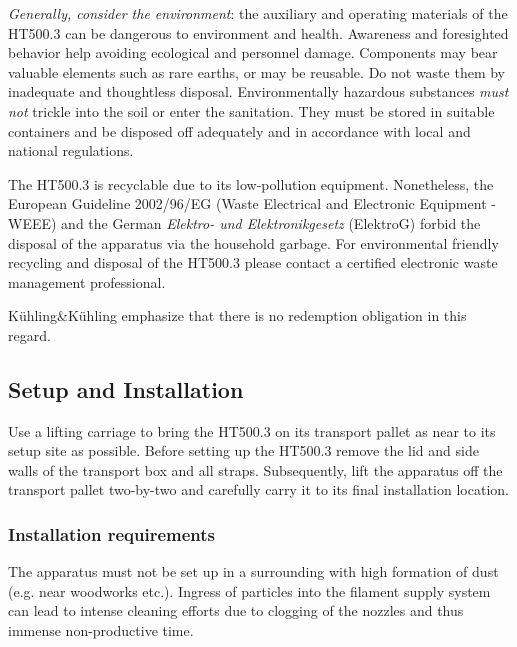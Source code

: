 \emph{Generally, consider the environment}: the auxiliary and operating materials of the HT500.3 can be dangerous to environment and health.
Awareness and foresighted behavior help avoiding ecological and personnel damage.
Components may bear valuable elements such as rare earths, or may be reusable. Do not waste them by inadequate and thoughtless disposal.
Environmentally hazardous substances \emph{must not} trickle into the soil or enter the sanitation. They must be stored in suitable containers and be disposed off adequately and in accordance with local and national regulations.

The HT500.3 is recyclable due to its low-pollution equipment. Nonetheless, the European Guideline 2002/96/EG (Waste Electrical and Electronic Equipment - WEEE) and the German \emph{Elektro- und Elektronikgesetz} (ElektroG) forbid the disposal of the apparatus via the household garbage. For environmental friendly recycling and disposal of the HT500.3 please contact a certified electronic waste management professional.

\begin{info}
  Kühling\&Kühling emphasize that there is no redemption obligation in this regard.
\end{info}



\subsection{Setup and Installation}

Use a lifting carriage to bring the HT500.3 on its transport pallet as near to its setup site as possible. Before setting up the HT500.3 remove the lid and side walls of the transport box and all straps. Subsequently, lift the apparatus off the transport pallet two-by-two and carefully carry it to its final installation location. 

\subsubsection{Installation requirements}

\begin{notice}
  The apparatus must not be set up in a surrounding with high formation of dust (e.g. near woodworks etc.). Ingress of particles into the filament supply system can lead to intense cleaning efforts due to clogging of the nozzles and thus immense non-productive time.
\end{notice}

